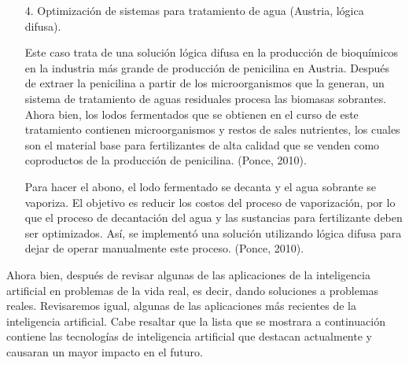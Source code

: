 \begin{itemize}
\item[4.]Optimización de sistemas para tratamiento de agua (Austria, lógica difusa).

Este caso trata de una solución lógica difusa en la producción de bioquímicos en la industria más grande de producción de penicilina en Austria. Después de extraer la penicilina a partir de los microorganismos que la generan, un sistema de tratamiento de aguas residuales procesa las biomasas sobrantes. Ahora bien, los lodos fermentados que se obtienen en el curso de este tratamiento contienen microorganismos y restos de sales nutrientes, los cuales son el material base para fertilizantes de alta calidad que se venden como coproductos de la producción de penicilina. (Ponce, 2010).

Para hacer el abono, el lodo fermentado se decanta y el agua sobrante se vaporiza. El objetivo es reducir los costos del proceso de vaporización, por lo que el proceso de decantación del agua y las sustancias para fertilizante deben ser optimizados. Así, se implementó una solución utilizando lógica difusa para dejar de operar manualmente este proceso. (Ponce, 2010).
\end{itemize}

Ahora bien, después de revisar algunas de las aplicaciones de la inteligencia artificial en problemas de la vida real, es decir, dando soluciones a problemas reales. Revisaremos igual, algunas de las aplicaciones más recientes de la inteligencia artificial. Cabe resaltar que la lista que se mostrara a continuación contiene las tecnologías de inteligencia artificial que destacan actualmente y causaran un mayor impacto en el futuro.

